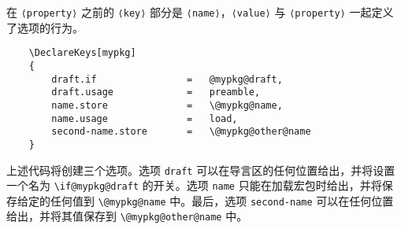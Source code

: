 在 \lstinline|⟨property⟩| 之前的 \lstinline|⟨key⟩| 部分是 \lstinline|⟨name⟩|，\lstinline|⟨value⟩| 与 \lstinline|⟨property⟩| 一起定义了选项的行为。
\begin{lstlisting}
    \DeclareKeys[mypkg]
    {
        draft.if                =   @mypkg@draft,
        draft.usage             =   preamble,
        name.store              =   \@mypkg@name,
        name.usage              =   load,
        second-name.store       =   \@mypkg@other@name
    }
\end{lstlisting}

上述代码将创建三个选项。选项 \lstinline|draft| 可以在导言区的任何位置给出，并将设置一个名为 \lstinline|\if@mypkg@draft| 的开关。选项 \lstinline|name| 只能在加载宏包时给出，并将保存给定的任何值到 \lstinline|\@mypkg@name| 中。最后，选项 \lstinline|second-name| 可以在任何位置给出，并将其值保存到 \lstinline|\@mypkg@other@name| 中。